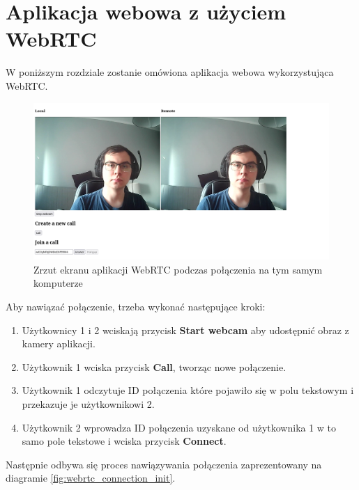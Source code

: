 \chapter{Aplikacja webowa z użyciem WebRTC}

W poniższym rozdziale zostanie omówiona aplikacja webowa wykorzystująca WebRTC.

\begin{figure}[htbp]
  \centering
  \includegraphics[width=\textwidth]{img/webrtc-app}
  \caption{Zrzut ekranu aplikacji WebRTC podczas połączenia na tym samym komputerze}
  \label{fig:webrtc_app}
\end{figure}

Aby nawiązać połączenie, trzeba wykonać następujące kroki:

\begin{enumerate}
  \item Użytkownicy 1 i 2 wciskają przycisk \textbf{Start webcam} aby udostępnić obraz z kamery aplikacji.
  \item Użytkownik 1 wciska przycisk \textbf{Call}, tworząc nowe połączenie.
  \item Użytkownik 1 odczytuje ID połączenia które pojawiło się w polu tekstowym i przekazuje je użytkownikowi 2.
  \item Użytkownik 2 wprowadza ID połączenia uzyskane od użytkownika 1 w to samo pole tekstowe i wciska przycisk
        \textbf{Connect}.
\end{enumerate}

Następnie odbywa się proces nawiązywania połączenia zaprezentowany na diagramie \ref{fig:webrtc_connection_init}.

